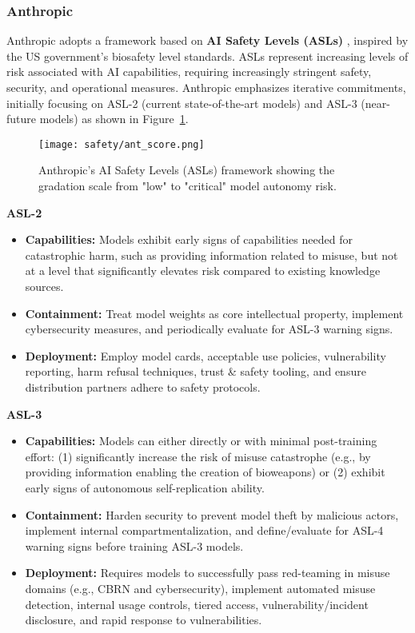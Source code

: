 \subsubsection{Anthropic}

Anthropic adopts a framework based on \textbf{AI Safety Levels (ASLs)} , inspired by the US government's biosafety level standards. ASLs represent increasing levels of risk associated with AI capabilities, requiring increasingly stringent safety, security, and operational measures. Anthropic emphasizes iterative commitments, initially focusing on ASL-2 (current state-of-the-art models) and ASL-3 (near-future models) as shown in Figure~\ref{anthropic-risk-scoring}.

\begin{figure}[H]
\centering
\texttt{[image: safety/ant\_score.png]}
\caption{Anthropic's AI Safety Levels (ASLs) framework showing the gradation scale from "low" to "critical" model autonomy risk.}
\label{anthropic-risk-scoring}
\end{figure}

\textbf{ASL-2}

\begin{itemize}
    \item \textbf{Capabilities:} Models exhibit early signs of capabilities needed for catastrophic harm, such as providing information related to misuse, but not at a level that significantly elevates risk compared to existing knowledge sources. 
    \item \textbf{Containment:} Treat model weights as core intellectual property, implement cybersecurity measures, and periodically evaluate for ASL-3 warning signs.
    \item \textbf{Deployment:} Employ model cards, acceptable use policies, vulnerability reporting, harm refusal techniques, trust \& safety tooling, and ensure distribution partners adhere to safety protocols.  
\end{itemize}

\textbf{ASL-3}

\begin{itemize}
    \item \textbf{Capabilities:} Models can either directly or with minimal post-training effort: (1) significantly increase the risk of misuse catastrophe (e.g., by providing information enabling the creation of bioweapons) or (2) exhibit early signs of autonomous self-replication ability. 
    \item \textbf{Containment:} Harden security to prevent model theft by malicious actors, implement internal compartmentalization, and define/evaluate for ASL-4 warning signs before training ASL-3 models.
    \item \textbf{Deployment:} Requires models to successfully pass red-teaming in misuse domains (e.g., CBRN and cybersecurity), implement automated misuse detection, internal usage controls, tiered access, vulnerability/incident disclosure, and rapid response to vulnerabilities.
\end{itemize}

